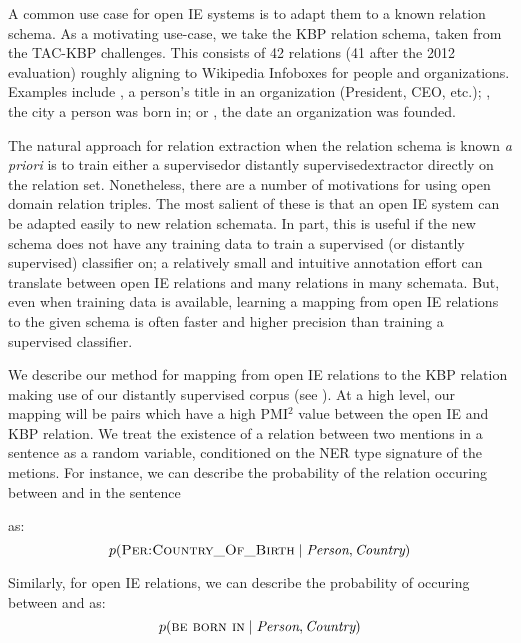 A common use case for open IE systems is to adapt them to a
  known relation schema.
As a motivating use-case, we take the KBP relation schema, taken from
  the TAC-KBP challenges.
This consists of 42 relations (41 after the 2012 evaluation) roughly
  aligning to Wikipedia Infoboxes for people and organizations.
  Examples include , a person's title in an
  organization (President, CEO, etc.); , the
  city a person was born in; or , the date an organization
  was founded.

The natural approach for relation extraction when the relation
  schema is known \textit{a priori} is to train either 
  a supervised\needcite or distantly supervised\needcite extractor
  directly on the relation set.
Nonetheless, there are a number of motivations for using open domain
  relation triples.
The most salient of these is that an open IE system can be adapted
  easily to new relation schemata.
In part, this is useful if the new schema does not have any training data
  to train a supervised (or distantly supervised) classifier on; a relatively
  small and intuitive annotation effort can translate between open IE relations
  and many relations in many schemata.
But, even when training data is available, learning a mapping from open IE
  relations to the given schema is often faster and higher precision than
  training a supervised classifier.

We describe our method for mapping from open IE relations to the KBP relation
  making use of our distantly supervised corpus (see ).
At a high level, our mapping will be pairs which have a high PMI$^2$ value
  between the open IE and KBP relation.
We treat the existence of a relation between two mentions in a sentence as
  a random variable, conditioned on the NER type signature of the metions.
For instance, we can describe the probability of the relation 
   occuring between  and
   in the sentence
\begin{center}
\end{center}
as:
\begin{equation*}
  p(\textsc{Per:Country\_Of\_Birth} \mid \textit{Person}, \textit{Country})
\end{equation*}

Similarly, for open IE relations, we can describe the probability of
   occuring between  and  as:
\begin{equation*}
  p(\textsc{be born in} \mid \textit{Person}, \textit{Country})
\end{equation*}


